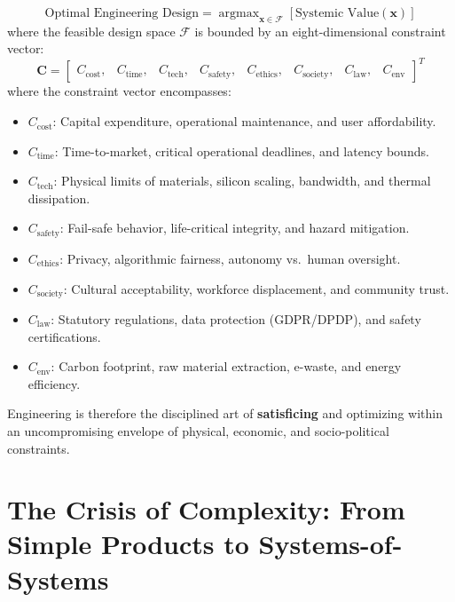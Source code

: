 \begin{equation}
    \text{Optimal Engineering Design} = \operatorname{argmax}_{\mathbf{x} \in \mathcal{F}} \left[ \text{Systemic Value}(\mathbf{x}) \right]
\end{equation}
where the feasible design space $\mathcal{F}$ is bounded by an eight-dimensional constraint vector:
\begin{equation}
    \mathbf{C} = \begin{bmatrix}
    C_{\text{cost}}, & C_{\text{time}}, & C_{\text{tech}}, & C_{\text{safety}}, & C_{\text{ethics}}, & C_{\text{society}}, & C_{\text{law}}, & C_{\text{env}}
    \end{bmatrix}^T
\end{equation}
where the constraint vector encompasses:
\begin{itemize}[leftmargin=2em, itemsep=1pt]
    \item $C_{\text{cost}}$: Capital expenditure, operational maintenance, and user affordability.
    \item $C_{\text{time}}$: Time-to-market, critical operational deadlines, and latency bounds.
    \item $C_{\text{tech}}$: Physical limits of materials, silicon scaling, bandwidth, and thermal dissipation.
    \item $C_{\text{safety}}$: Fail-safe behavior, life-critical integrity, and hazard mitigation.
    \item $C_{\text{ethics}}$: Privacy, algorithmic fairness, autonomy vs.~human oversight.
    \item $C_{\text{society}}$: Cultural acceptability, workforce displacement, and community trust.
    \item $C_{\text{law}}$: Statutory regulations, data protection (GDPR/DPDP), and safety certifications.
    \item $C_{\text{env}}$: Carbon footprint, raw material extraction, e-waste, and energy efficiency.
\end{itemize}

Engineering is therefore the disciplined art of \textbf{satisficing} and optimizing within an uncompromising envelope of physical, economic, and socio-political constraints.

\section{The Crisis of Complexity: From Simple Products to Systems-of-Systems}
\label{sec:crisis_complexity}

